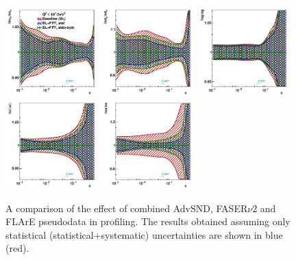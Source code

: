 \begin{figure}[t]
\centering
\includegraphics[width=0.32\textwidth]{plots/proton_fasernu2/FPF/fred05fcorr05_FPF_q2_10000_pdf_uv_ratio.pdf}
\includegraphics[width=0.32\textwidth]{plots/proton_fasernu2/FPF/fred05fcorr05_FPF_q2_10000_pdf_dv_ratio.pdf}
\includegraphics[width=0.32\textwidth]{plots/proton_fasernu2/FPF/fred05fcorr05_FPF_q2_10000_pdf_g_ratio.pdf}\\
\includegraphics[width=0.32\textwidth]{plots/proton_fasernu2/FPF/fred05fcorr05_FPF_q2_10000_pdf_Sea_ratio.pdf}
\includegraphics[width=0.32\textwidth]{plots/proton_fasernu2/FPF/fred05fcorr05_FPF_q2_10000_pdf_s_ratio.pdf}
\caption{
A comparison of the effect of combined  AdvSND, FASER$\nu2$ and FLArE pseudodata in profiling. 
The results obtained assuming only statistical (statistical+systematic) uncertainties are shown in blue (red).
}
\label{fig:profiling_FPF}
\end{figure}


